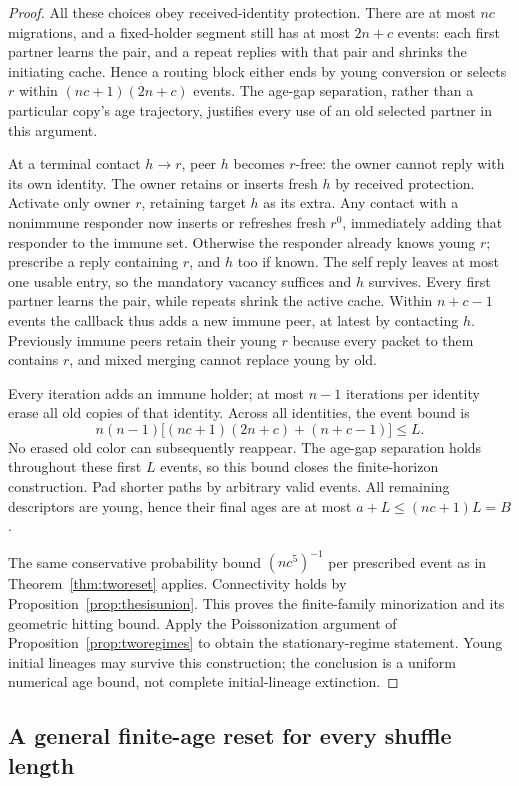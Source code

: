 \documentclass[11pt]{article}
\begin{document}
\begin{proof}
All these choices obey received-identity protection.
There are at most $nc$ migrations, and a fixed-holder
segment still has at most $2n+c$ events: each first partner
learns the pair, and a repeat replies with that pair and
shrinks the initiating cache. Hence a routing block either
ends by young conversion or selects $r$ within
$(nc+1)(2n+c)$ events. The age-gap separation, rather than
a particular copy's age trajectory, justifies every use
of an old selected partner in this argument.

At a terminal contact $h\to r$, peer $h$ becomes $r$-free:
the owner cannot reply with its own identity. The owner
retains or inserts fresh $h$ by received protection.
Activate only owner $r$, retaining target $h$ as its extra.
Any contact with a nonimmune responder now inserts or
refreshes fresh $r^0$, immediately adding that responder
to the immune set. Otherwise the responder already knows
young $r$; prescribe a reply containing $r$, and $h$ too
if known. The self reply leaves at most one usable entry,
so the mandatory vacancy suffices and $h$ survives.
Every first partner learns the pair, while repeats shrink
the active cache. Within $n+c-1$ events the callback thus
adds a new immune peer, at latest by contacting $h$.
Previously immune peers retain their young $r$ because
every packet to them contains $r$, and mixed merging
cannot replace young by old.

Every iteration adds an immune holder; at most $n-1$
iterations per identity erase all old copies of that
identity. Across all identities, the event bound is
\[
 n(n-1)\bigl[(nc+1)(2n+c)+(n+c-1)\bigr]\le L.
\]
No erased old color can subsequently reappear.
The age-gap separation holds throughout these first $L$
events, so this bound closes the finite-horizon construction.
Pad shorter paths by arbitrary valid events. All remaining
descriptors are young, hence their final ages are at most
$a+L\le(nc+1)L=B$.

The same conservative probability bound $(nc^5)^{-1}$
per prescribed event as in Theorem~\ref{thm:tworeset}
applies. Connectivity holds by Proposition~\ref{prop:thesisunion}.
This proves the finite-family minorization and its geometric
hitting bound. Apply the Poissonization argument of
Proposition~\ref{prop:tworegimes} to obtain the stationary-regime
statement. Young initial lineages may survive this construction;
the conclusion is a uniform numerical age bound, not complete
initial-lineage extinction.
\end{proof}

\subsection{A general finite-age reset for every shuffle length}
\end{document}
